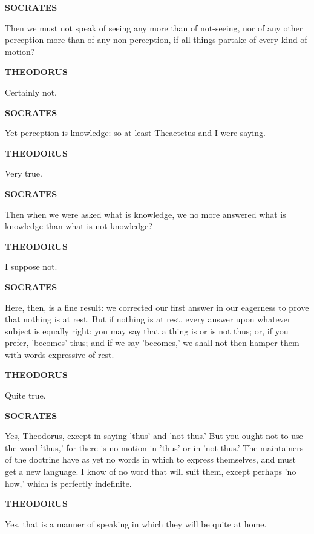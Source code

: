 \documentclass[11pt,letter]{article}
\begin{document}
\par \textbf{SOCRATES}
\par   Then we must not speak of seeing any more than of not-seeing, nor of any other perception more than of any non-perception, if all things partake of every kind of motion?

\par \textbf{THEODORUS}
\par   Certainly not.

\par \textbf{SOCRATES}
\par   Yet perception is knowledge:  so at least Theaetetus and I were saying.

\par \textbf{THEODORUS}
\par   Very true.

\par \textbf{SOCRATES}
\par   Then when we were asked what is knowledge, we no more answered what is knowledge than what is not knowledge?

\par \textbf{THEODORUS}
\par   I suppose not.

\par \textbf{SOCRATES}
\par   Here, then, is a fine result:  we corrected our first answer in our eagerness to prove that nothing is at rest. But if nothing is at rest, every answer upon whatever subject is equally right:  you may say that a thing is or is not thus; or, if you prefer, 'becomes' thus; and if we say 'becomes,' we shall not then hamper them with words expressive of rest.

\par \textbf{THEODORUS}
\par   Quite true.

\par \textbf{SOCRATES}
\par   Yes, Theodorus, except in saying 'thus' and 'not thus.' But you ought not to use the word 'thus,' for there is no motion in 'thus' or in 'not thus.' The maintainers of the doctrine have as yet no words in which to express themselves, and must get a new language. I know of no word that will suit them, except perhaps 'no how,' which is perfectly indefinite.

\par \textbf{THEODORUS}
\par   Yes, that is a manner of speaking in which they will be quite at home.
\end{document}
